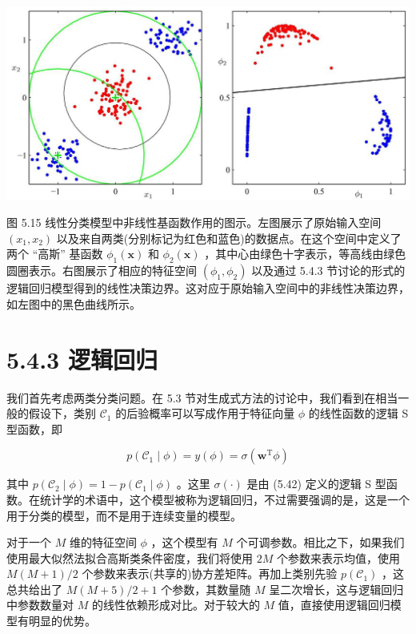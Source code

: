 \documentclass[10pt]{article}
\begin{document}
\begin{center}
\includegraphics[max width=1.0\textwidth]{images/0194e279-9b28-703a-88f4-c3ac21e2010d_178_200_356_1323_635_0.jpg}
\end{center}
\hspace*{3em} 

图 5.15 线性分类模型中非线性基函数作用的图示。左图展示了原始输入空间 \(\left( {{x}_{1},{x}_{2}}\right)\) 以及来自两类(分别标记为红色和蓝色)的数据点。在这个空间中定义了两个 “高斯” 基函数 \({\phi }_{1}\left( \mathbf{x}\right)\) 和 \({\phi }_{2}\left( \mathbf{x}\right)\) ，其中心由绿色十字表示，等高线由绿色圆圈表示。右图展示了相应的特征空间 \(\left( {{\phi }_{1},{\phi }_{2}}\right)\) 以及通过 5.4.3 节讨论的形式的逻辑回归模型得到的线性决策边界。这对应于原始输入空间中的非线性决策边界，如左图中的黑色曲线所示。

\section*{5.4.3 逻辑回归}

我们首先考虑两类分类问题。在 5.3 节对生成式方法的讨论中，我们看到在相当一般的假设下，类别 \({\mathcal{C}}_{1}\) 的后验概率可以写成作用于特征向量 \(\phi\) 的线性函数的逻辑 S 型函数，即

\[
p\left( {{\mathcal{C}}_{1} \mid  \phi }\right)  = y\left( \phi \right)  = \sigma \left( {{\mathbf{w}}^{\mathrm{T}}\phi }\right)  \tag{5.71}
\]

其中 \(p\left( {{\mathcal{C}}_{2} \mid  \phi }\right)  = 1 - p\left( {{\mathcal{C}}_{1} \mid  \phi }\right)\) 。这里 \(\sigma \left( \cdot \right)\) 是由 (5.42) 定义的逻辑 S 型函数。在统计学的术语中，这个模型被称为逻辑回归，不过需要强调的是，这是一个用于分类的模型，而不是用于连续变量的模型。

对于一个 \(M\) 维的特征空间 \(\phi\) ，这个模型有 \(M\) 个可调参数。相比之下，如果我们使用最大似然法拟合高斯类条件密度，我们将使用 \({2M}\) 个参数来表示均值，使用 \(M\left( {M + 1}\right) /2\) 个参数来表示(共享的)协方差矩阵。再加上类别先验 \(p\left( {\mathcal{C}}_{1}\right)\) ，这总共给出了 \(M\left( {M + 5}\right) /2 + 1\) 个参数，其数量随 \(M\) 呈二次增长，这与逻辑回归中参数数量对 \(M\) 的线性依赖形成对比。对于较大的 \(M\) 值，直接使用逻辑回归模型有明显的优势。
\end{document}
